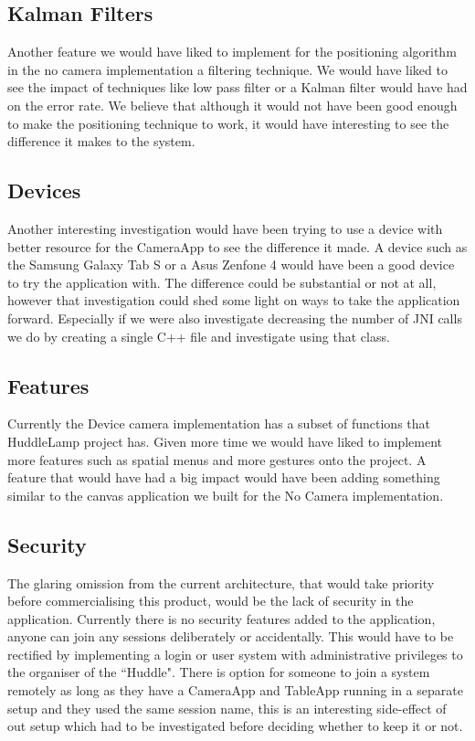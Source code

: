 \subsection{Kalman Filters}
Another feature we would have liked to implement for the positioning algorithm in the no camera implementation a filtering technique. We would have liked to see the impact of techniques like low pass filter or a Kalman filter would have had on the error rate. We believe that although it would not have been good enough to make the positioning technique to work, it would have interesting to see the difference it makes to the system.

\subsection{Devices}
Another interesting investigation would have been trying to use a device with better resource for the CameraApp to see the difference it made. A device such as the Samsung Galaxy Tab S or a Asus Zenfone 4 would have been a good device to try the application with. The difference could be substantial or not at all, however that investigation could shed some light on ways to take the application forward. Especially if we were also investigate decreasing the number of JNI calls we do by creating a single C++ file and investigate using that class.

\subsection{Features}
Currently the Device camera implementation has a subset of functions that HuddleLamp project has. Given more time we would have liked to implement more features such as spatial menus and more gestures onto the project. A feature that would have had a big impact would have been adding something similar to the canvas application we built for the No Camera implementation.

\subsection{Security}
The glaring omission from the current architecture, that would take priority before commercialising this product, would be the lack of security in the application. Currently there is no security features added to the application, anyone can join any sessions deliberately or accidentally. This would have to be rectified by implementing a login or user system with administrative privileges to the organiser of the ``Huddle". There is option for someone to join a system remotely as long as they have a CameraApp and TableApp running in a separate setup and they used the same session name, this is an interesting side-effect of out setup which had to be investigated before deciding whether to keep it or not.

